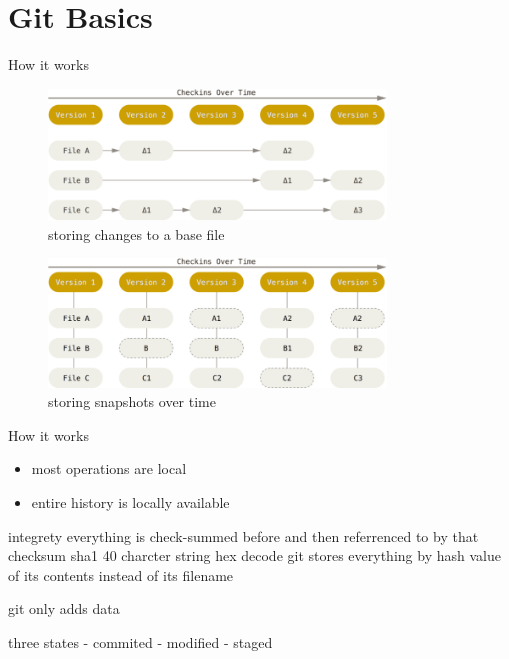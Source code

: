 \section{Git Basics}

\begin{frame}[fragile]{How it works}
    \begin{minipage}{\textwidth}
        \begin{figure}
            \centering
            \includegraphics[width=0.8\textwidth]{img/filebased.png}
            \caption{storing changes to a base file}
        \end{figure}
    \end{minipage}
    \begin{minipage}{\textwidth}
        \begin{figure}
            \centering
            \includegraphics[width=0.8\textwidth]{img/snapshotbased.png}
            \caption{storing snapshots over time}
        \end{figure}
    \end{minipage}
\end{frame}

\begin{frame}{How it works}

    \begin{itemize}
        \item most operations are local
        \item entire history is locally available
    \end{itemize}

    integrety
    everything is check-summed before and then referrenced to by that checksum
    sha1 40 charcter string hex decode
    git stores everything by hash value of its contents instead of its filename

    git only adds data

    three states
    - commited
    - modified
    - staged

\end{frame}

